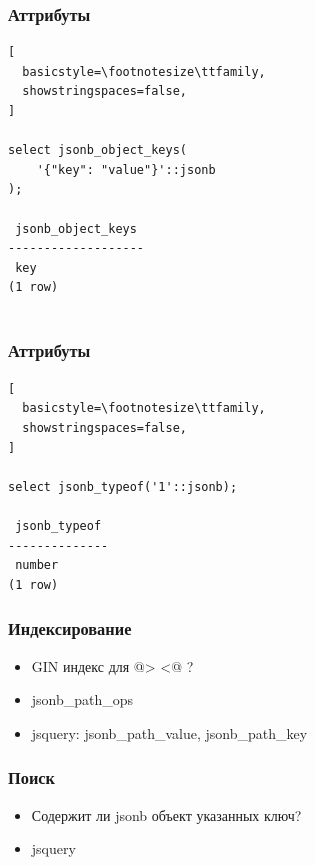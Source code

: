 \documentclass[14pt, compress, aspectratio=169]{beamer}
\begin{document}
\begin{frame}[fragile]
  \frametitle{Аттрибуты}

\begin{lstlisting}[
  basicstyle=\footnotesize\ttfamily,
  showstringspaces=false,
]

select jsonb_object_keys(
    '{"key": "value"}'::jsonb
);

 jsonb_object_keys 
-------------------
 key
(1 row)
         
\end{lstlisting}

\end{frame}

\begin{frame}[fragile]
  \frametitle{Аттрибуты}

\begin{lstlisting}[
  basicstyle=\footnotesize\ttfamily,
  showstringspaces=false,
]

select jsonb_typeof('1'::jsonb);

 jsonb_typeof 
--------------
 number
(1 row)

\end{lstlisting}

\end{frame}

\begin{frame}[fragile]
  \frametitle{Индексирование}

  \begin{itemize}[label={\MVRightarrow}]
    \item GIN индекс для @> <@ ?
    \item jsonb\_path\_ops
    \item jsquery: jsonb\_path\_value, jsonb\_path\_key
  \end{itemize}

\end{frame}

\begin{frame}[fragile]
  \frametitle{Поиск}

  \begin{itemize}[label={\MVRightarrow}]
    \item Содержит ли jsonb объект указанных ключ?
    \item jsquery
  \end{itemize}

\end{frame}
\end{document}
